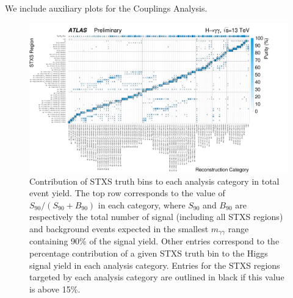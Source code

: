 

We include auxiliary plots for the Couplings Analysis.


\begin{figure}
\centering
\includegraphics[width=\textwidth]{figures/couplings_chapter/purity_2D.pdf}
\caption{Contribution of STXS truth bins to each analysis category in total event yield. The top row corresponds to the value of $S_{90}/(S_{90} + B_{90})$ in each category, where $S_{90}$ and $B_{90}$ are respectively the total number of signal (including all STXS regions) and background events expected in the smallest $m_{\gamma \gamma}$ range containing 90\% of the signal yield. Other entries correspond to the percentage contribution of a given STXS truth bin to the Higgs signal yield in each analysis category. Entries for the STXS regions targeted by each analysis category are outlined in black if this value is above 15\%. }
\label{fig:design:yields}
\end{figure}

